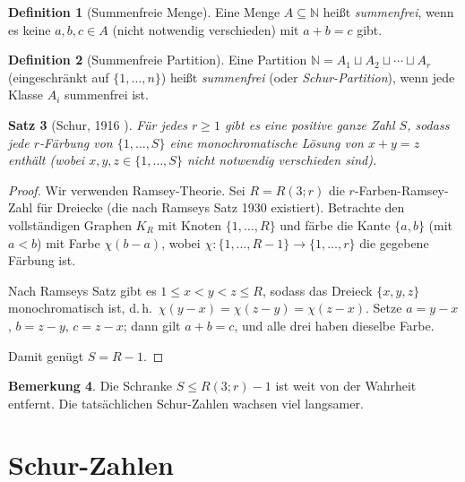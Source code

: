 \documentclass[12pt,a4paper]{amsart}
\newtheorem{theorem}{Satz}[section]
\theoremstyle{definition}
\newtheorem{definition}[theorem]{Definition}
\newtheorem{remark}[theorem]{Bemerkung}
\newcommand{\N}{\mathbb{N}}
\begin{document}
\begin{definition}[Summenfreie Menge]
Eine Menge $A \subseteq \N$ heißt \emph{summenfrei}, wenn es keine
$a, b, c \in A$ (nicht notwendig verschieden) mit $a + b = c$ gibt.
\end{definition}

\begin{definition}[Summenfreie Partition]
Eine Partition $\N = A_1 \sqcup A_2 \sqcup \cdots \sqcup A_r$ (eingeschränkt auf
$\{1, \ldots, n\}$) heißt \emph{summenfrei} (oder \emph{Schur-Partition}), wenn
jede Klasse $A_i$ summenfrei ist.
\end{definition}

\begin{theorem}[Schur, 1916 \cite{Schur1916}]\label{satz:schur}
Für jedes $r \geq 1$ gibt es eine positive ganze Zahl $S$, sodass jede
$r$-Färbung von $\{1, \ldots, S\}$ eine monochromatische Lösung von
$x + y = z$ enthält (wobei $x, y, z \in \{1, \ldots, S\}$ nicht notwendig
verschieden sind).
\end{theorem}

\begin{proof}
Wir verwenden Ramsey-Theorie. Sei $R = R(3; r)$ die $r$-Farben-Ramsey-Zahl für
Dreiecke (die nach Ramseys Satz 1930 existiert). Betrachte den vollständigen
Graphen $K_R$ mit Knoten $\{1, \ldots, R\}$ und färbe die Kante $\{a, b\}$
(mit $a < b$) mit Farbe $\chi(b - a)$, wobei $\chi: \{1,\ldots, R-1\} \to \{1,\ldots,r\}$
die gegebene Färbung ist.

Nach Ramseys Satz gibt es $1 \leq x < y < z \leq R$, sodass das Dreieck
$\{x, y, z\}$ monochromatisch ist, d.\,h.\ $\chi(y-x) = \chi(z-y) = \chi(z-x)$.
Setze $a = y-x$, $b = z-y$, $c = z-x$; dann gilt $a + b = c$, und alle drei
haben dieselbe Farbe.

Damit genügt $S = R - 1$.
\end{proof}

\begin{remark}
Die Schranke $S \leq R(3; r) - 1$ ist weit von der Wahrheit entfernt. Die tatsächlichen
Schur-Zahlen wachsen viel langsamer.
\end{remark}

\section{Schur-Zahlen}\label{sec:schur-zahlen}
\end{document}
